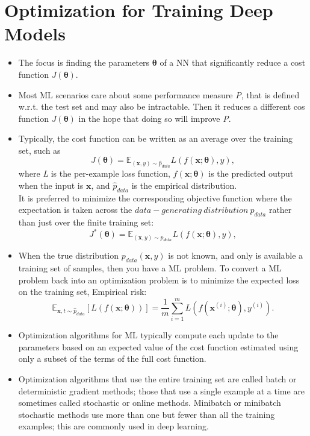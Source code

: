 \documentclass{article}
\begin{document}
\section{Optimization for Training Deep Models}
\begin{itemize}
\item The focus is finding the parameters \(\boldsymbol{\theta}\) of a NN that significantly reduce a cost function \(J(\boldsymbol{\theta})\).
\item Most ML scenarios care about some performance measure \textit{P}, that is defined w.r.t. the test set and may also be intractable. Then it reduces a different cos function \(J(\boldsymbol{\theta})\) in the hope that doing so will improve \textit{P}.
\item Typically, the cost function can be written as an average over the training set, such as
\[
	J(\boldsymbol{\theta}) = \mathbb{E}_{(\boldsymbol{x}, y) \sim \hat{p}_{data}}L(f(\boldsymbol{x}; \boldsymbol{\theta}), y),
\]
where \textit{L} is the per-example loss function, \(f(\boldsymbol{x}; \boldsymbol{\theta})\) is the predicted output when the input is \(\boldsymbol{x}\), and \(\hat{p}_{data}\) is the empirical distribution.\\ It is preferred to minimize the corresponding objective function where the expectation is taken across the \(data-generating\  distribution\  p_{data}\) rather than just over the finite training set:
\[
	J^{*}(\boldsymbol{\theta}) = \mathbb{E}_{(\boldsymbol{x}, y) \sim p_{data}}L(f(\boldsymbol{x}; \boldsymbol{\theta}), y),
\]
\item When the true distribution \(p_{data}(\boldsymbol{x}, y)\) is not known, and only is available a training set of samples, then you have a ML problem. To convert a ML problem back into an optimization problem is to minimize the expected loss on the training set, Empirical risk:
\[
	\mathbb{E}_{\boldsymbol{x}, t \sim \hat{p}_{data}}[L(f(\boldsymbol{x}; \boldsymbol{\theta}))] = \frac{1}{m}\sum^m_{i = 1}L(f(\boldsymbol{x}^{(i)}; \boldsymbol{\theta}), y^{(i)}).
\]
\item Optimization algorithms for ML typically compute each update to the parameters based on an expected value of the cost function estimated using only a subset of the terms of the full cost function.
\item Optimization algorithms that use the entire training set are called batch or deterministic gradient methods; those that use a single example at a time are sometimes called stochastic or online methods. Minibatch or minibatch stochastic methods use more than one but fewer than all the training examples; this are commonly used in deep learning.

\end{itemize}
\end{document}
